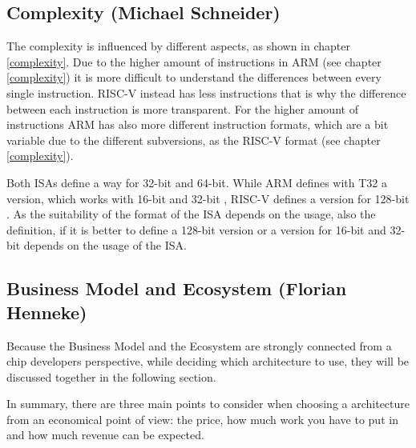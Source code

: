 \documentclass[conference]{IEEEtran}
\begin{document}
	\subsection{Complexity (Michael Schneider)}
	The complexity is influenced by different aspects, as shown in chapter \ref{complexity}.
	 Due to the higher amount of instructions in ARM (see chapter \ref{complexity}) it is more difficult to understand the differences between every single instruction. RISC-V instead has less instructions that is why the difference between each instruction is more transparent. 
	 For the higher amount of instructions ARM has also more different instruction formats, which are a bit variable due to the different subversions, as the RISC-V format (see chapter \ref{complexity}).
	
	Both \glspl{ISA} define a way for 32-bit and 64-bit. While ARM defines with T32 a version, which works with 16-bit and 32-bit \cite[page 38]{Arm2020}, RISC-V defines a version for 128-bit \cite[page 3ff]{Waterman2017}. As the suitability of the format of the \gls{ISA} depends on the usage, also the definition, if it is better to define a 128-bit version or a version for 16-bit and 32-bit depends on the usage of the \gls{ISA}.

	\subsection{Business Model and Ecosystem (Florian Henneke)}
	Because the Business Model and the Ecosystem are strongly connected from a chip developers perspective, while deciding which architecture to use, they will be discussed together in the following section.

	In summary, there are three main points to consider when choosing a architecture from an economical point of view: the price, how much work you have to put in and how much revenue can be expected.
\end{document}
